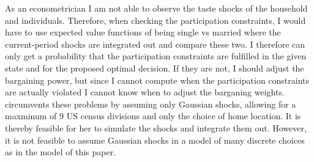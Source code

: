 As an econometrician I am not able to observe the taste shocks of the household and individuals. Therefore, when checking the participation constraints, I would have to use expected value functions of being single vs married where the current-period shocks are integrated out and compare these two. I therefore can only get a probability that the participation constraints are fulfilled in the given state and for the proposed optimal decision. If they are not, I should adjust the bargaining power, but since I cannot compute when the participation constraints are actually violated I cannot know when to adjust the barganing weights. \cite{Gemici2011} circumvents these problems by assuming only Gaussian shocks, allowing for a maxminum of 9 US census divisions and only the choice of home location. It is thereby feasible for her to simulate the shocks and integrate them out. However, it is not feasible to assume Gaussian shocks in a model of many discrete choices as in the model of this paper.



